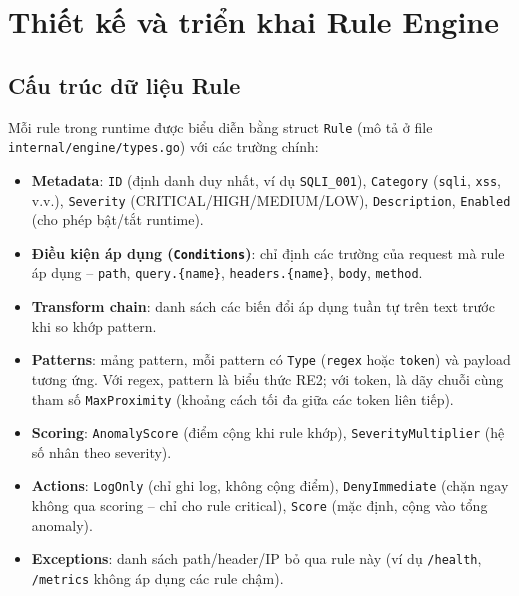 \documentclass[../DoAn.tex]{subfiles}
\begin{document}
\section{Thiết kế và triển khai Rule Engine}
\label{section:4.2}

\subsection{Cấu trúc dữ liệu Rule}
\label{subsection:4.2.1}

Mỗi rule trong runtime được biểu diễn bằng struct \texttt{Rule} (mô tả ở
file \texttt{internal/engine/types.go}) với các trường chính:

\begin{itemize}[leftmargin=*]
    \item \textbf{Metadata}: \texttt{ID} (định danh duy nhất, ví dụ
    \texttt{SQLI\_001}), \texttt{Category} (\texttt{sqli}, \texttt{xss},
    v.v.), \texttt{Severity} (CRITICAL/HIGH/MEDIUM/LOW), \texttt{Description},
    \texttt{Enabled} (cho phép bật/tắt runtime).

    \item \textbf{Điều kiện áp dụng (\texttt{Conditions})}: chỉ định các
    trường của request mà rule áp dụng -- \texttt{path}, \texttt{query.\{name\}},
    \texttt{headers.\{name\}}, \texttt{body}, \texttt{method}.

    \item \textbf{Transform chain}: danh sách các biến đổi áp dụng tuần tự
    trên text trước khi so khớp pattern.

    \item \textbf{Patterns}: mảng pattern, mỗi pattern có \texttt{Type}
    (\texttt{regex} hoặc \texttt{token}) và payload tương ứng. Với regex,
    pattern là biểu thức RE2; với token, là dãy chuỗi cùng tham số
    \texttt{MaxProximity} (khoảng cách tối đa giữa các token liên tiếp).

    \item \textbf{Scoring}: \texttt{AnomalyScore} (điểm cộng khi rule khớp),
    \texttt{SeverityMultiplier} (hệ số nhân theo severity).

    \item \textbf{Actions}: \texttt{LogOnly} (chỉ ghi log, không cộng điểm),
    \texttt{DenyImmediate} (chặn ngay không qua scoring -- chỉ cho rule
    critical), \texttt{Score} (mặc định, cộng vào tổng anomaly).

    \item \textbf{Exceptions}: danh sách path/header/IP bỏ qua rule này
    (ví dụ \texttt{/health}, \texttt{/metrics} không áp dụng các rule chậm).
\end{itemize}
\end{document}
